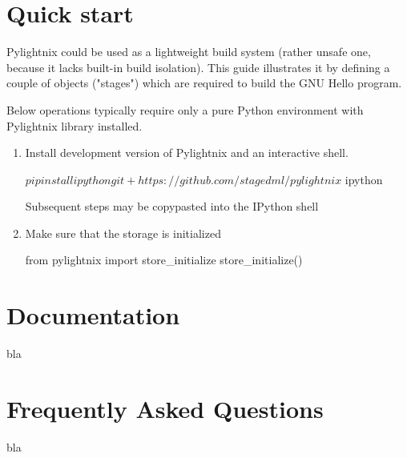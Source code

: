 \documentclass{article}
\begin{document}
\section{Quick start} Pylightnix could be used as a lightweight build system
(rather unsafe one, because it lacks built-in build isolation). This guide
illustrates it by defining a couple of objects ("stages") which are required  to
build the GNU Hello program.

Below operations typically require only a pure Python environment with
Pylightnix library installed.

\begin{enumerate}

  \item Install development version of Pylightnix and an interactive shell.
    \begin{shellcode}
    $ pip install ipython git+https://github.com/stagedml/pylightnix
    $ ipython
    \end{shellcode}
    Subsequent steps may be copypasted into the IPython shell

  \item Make sure that the storage is initialized
    \begin{pythoncode}
    from pylightnix import store_initialize
    store_initialize()
    \end{pythoncode}

\end{enumerate}


\section{Documentation}
bla
\section{Frequently Asked Questions}
bla
\end{document}
